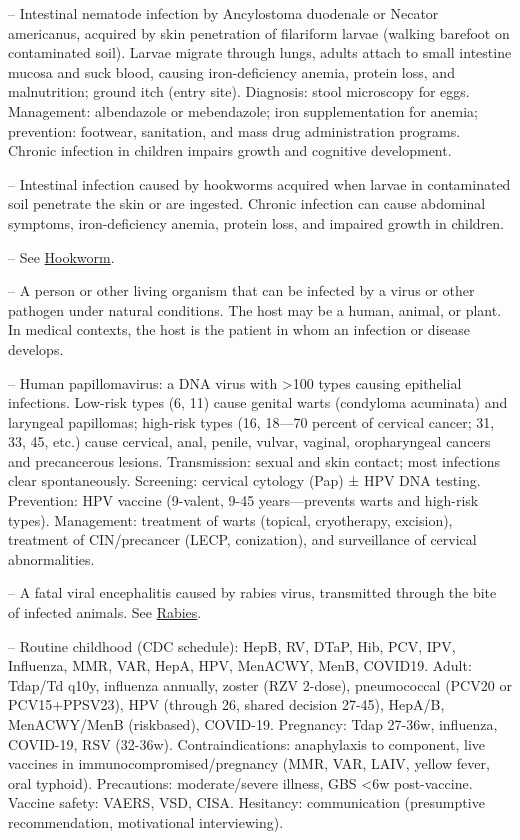 -- Intestinal nematode infection by Ancylostoma duodenale or Necator americanus, acquired by skin penetration of filariform larvae (walking barefoot on contaminated soil). Larvae migrate through lungs, adults attach to small intestine mucosa and suck blood, causing iron-deficiency anemia, protein loss, and malnutrition; ground itch (entry site). Diagnosis: stool microscopy for eggs. Management: albendazole or mebendazole; iron supplementation for anemia; prevention: footwear, sanitation, and mass drug administration programs. Chronic infection in children impairs growth and cognitive development.

-- Intestinal infection caused by hookworms acquired when larvae in contaminated soil penetrate the skin or are ingested. Chronic infection can cause abdominal symptoms, iron-deficiency anemia, protein loss, and impaired growth in children.

-- See \hyperlink{Hookworm}{Hookworm}.

-- A person or other living organism that can be infected by a virus or other pathogen under natural conditions. The host may be a human, animal, or plant. In medical contexts, the host is the patient in whom an infection or disease develops.

-- Human papillomavirus: a DNA virus with >100 types causing epithelial infections. Low-risk types (6, 11) cause genital warts (condyloma acuminata) and laryngeal papillomas; high-risk types (16, 18—70 percent of cervical cancer; 31, 33, 45, etc.) cause cervical, anal, penile, vulvar, vaginal, oropharyngeal cancers and precancerous lesions. Transmission: sexual and skin contact; most infections clear spontaneously. Screening: cervical cytology (Pap) ± HPV DNA testing. Prevention: HPV vaccine (9-valent, 9-45 years—prevents warts and high-risk types). Management: treatment of warts (topical, cryotherapy, excision), treatment of CIN/precancer (LECP, conization), and surveillance of cervical abnormalities.

-- A fatal viral encephalitis caused by rabies virus, transmitted through the bite of infected animals. See \hyperlink{Rabies}{Rabies}.

-- Routine childhood (CDC schedule): HepB, RV, DTaP, Hib, PCV, IPV, Influenza, MMR, VAR, HepA, HPV, MenACWY, MenB, COVID19. Adult: Tdap/Td q10y, influenza annually, zoster (RZV 2-dose), pneumococcal (PCV20 or PCV15+PPSV23), HPV (through 26, shared decision 27-45), HepA/B, MenACWY/MenB (riskbased), COVID-19. Pregnancy: Tdap 27-36w, influenza, COVID-19, RSV (32-36w). Contraindications: anaphylaxis to component, live vaccines in immunocompromised/pregnancy (MMR, VAR, LAIV, yellow fever, oral typhoid). Precautions: moderate/severe illness, GBS <6w post-vaccine. Vaccine safety: VAERS, VSD, CISA. Hesitancy: communication (presumptive recommendation, motivational interviewing).

